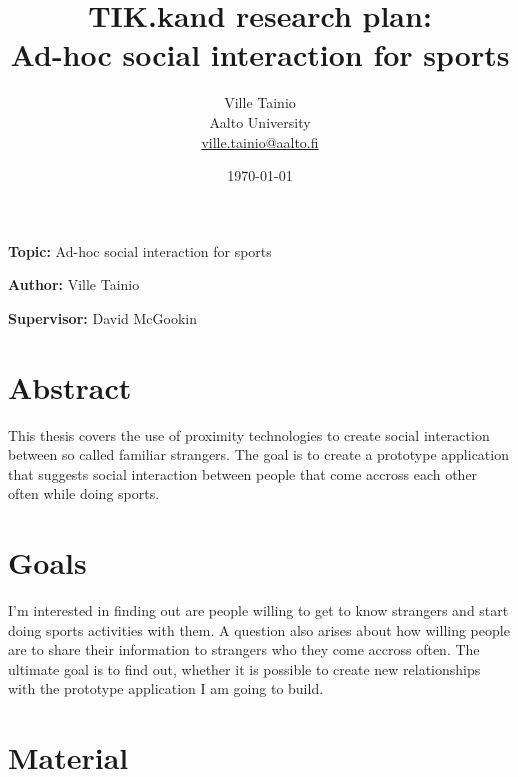 \documentclass[12pt,a4paper,finnish,oneside]{article}
\begin{document}

\title{TIK.kand research plan:\\[5mm]
Ad-hoc social interaction for sports}

\author{Ville Tainio\\
Aalto University\\
\url{ville.tainio@aalto.fi}}

\date{\today}

\maketitle


%

\textbf{Topic:} Ad-hoc social interaction for sports

\textbf{Author:} Ville Tainio

\textbf{Supervisor:} David McGookin


\section{Abstract}

This thesis covers the use of proximity technologies to create social
interaction between so called familiar strangers. The goal is to create a
prototype application that suggests social interaction between people that
come accross each other often while doing sports.

\section{Goals}

I'm interested in finding out are people willing to get to know strangers
and start doing sports activities with them. A question also arises about how
willing people are to share their information to strangers who they come accross
often. The ultimate goal is to find out, whether it is possible to create new
relationships with the prototype application I am going to build.

\section{Material}
\end{document}
